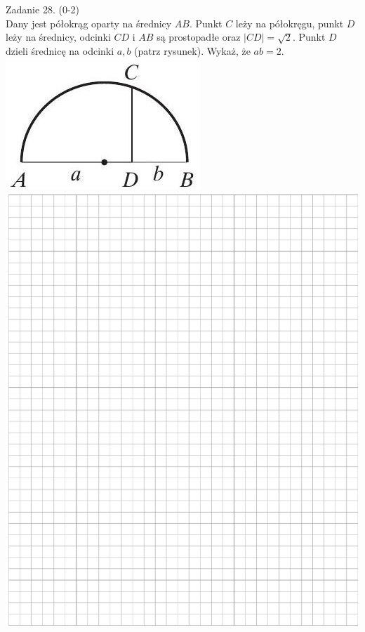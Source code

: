 \documentclass[10pt]{article}
\begin{document}
Zadanie 28. (0-2)\\
Dany jest półokrąg oparty na średnicy \(A B\). Punkt \(C\) leży na półokręgu, punkt \(D\) leży na średnicy, odcinki \(C D\) i \(A B\) są prostopadłe oraz \(|C D|=\sqrt{2}\). Punkt \(D\) dzieli średnicę na odcinki \(a, b\) (patrz rysunek). Wykaż, że \(a b=2\).\\
\includegraphics[max width=\textwidth, center]{2024_11_21_99eb8e6624b497a5af43g-12}\\
\includegraphics[max width=\textwidth, center]{2024_11_21_99eb8e6624b497a5af43g-12(1)}
\end{document}
